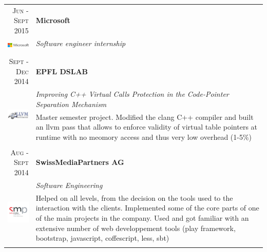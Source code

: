 \documentclass[a4paper,11pt]{article} %
\begin{document}
\begin{tabularx}{\textwidth}{r|X}


\textsc{Jun - Sept 2015} & \textbf{Microsoft} \\
\multirow{2}{*}{ \includegraphics[width=60pt]{img/microsoft.eps}}
& \emph{Software engineer internship}\\ 
& \footnotesize{}\\
\multicolumn{2}{c}{} \\


\textsc{Sept - Dec 2014} & \textbf{EPFL DSLAB} \\
\multirow{2}{*}{ \includegraphics[width=60pt]{img/llvm.eps}}
& \emph{Improving C++ Virtual Calls Protection in the Code-Pointer Separation Mechanism}\\ 
& \footnotesize{Master semester project. Modified the clang C++ compiler and
built an llvm pass that allows to enforce validity of virtual table pointers at
runtime with no meomory access and thus very low overhead (1-5\%)}\\
\multicolumn{2}{c}{} \\


\textsc{Aug - Sept 2014} & \textbf{SwissMediaPartners AG} \\
\multirow{4}{*}{ \includegraphics[width=60pt]{img/smp.jpg}}
& \emph{Software Engineering}\\ 
& \footnotesize{Helped on all levels, from the decision on the tools used to the
interaction with the clients. Implemented some of the core parts of one of the
main projects in the company. Used and got familiar with an extensive number of
web developpement tools (play framework, bootstrap, javascript, coffescript,
less, sbt)}\\
\multicolumn{2}{c}{} \\


\end{tabularx}
\end{document}
